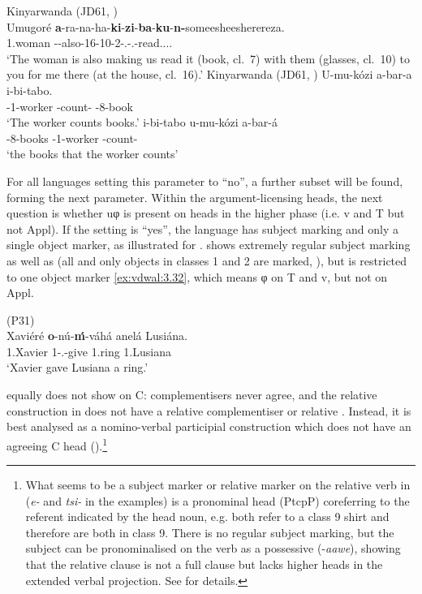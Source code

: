 \documentclass[output=paper]{langsci/langscibook}
\begin{document}
\ea\label{ex:vdwal:3.30}Kinyarwanda (JD61, \citealt[183]{BeauNurRos2004})\label{bkm:Ref317954425}\\
    \gll Umugoré  \textbf{a}{}-ra-na-ha-\textbf{ki}{}-\textbf{zi}{}-\textbf{ba}{}-\textbf{ku}{}-\textbf{n-}someesheesherereza.\\
    1.woman \First\Sm{}{}-\Dj{}-also-16\Om{}-10\Om{}-2\Om-\Ssg.\Om-\Fsg.\Om-read.\Caus{}.\Caus{}.\Appl{}.\Appl{}\\
    \glt    ‘The woman is also making us read it (book, cl.\ 7) with them (glasses,
        cl.\ 10) to you for me there (at the house, cl.\ 16).’
\ex \label{ex:vdwal:3.31}Kinyarwanda (JD61, \citealt[11]{ZellerNgoboka2014})\label{bkm:Ref345185298}
	\ea
	\gll	 U-mu-kózi  a-bar-a  i-bi-tabo.\\
	    \Aug{}{}-1-worker  \First\Sm{}{}-count-\Fv{}  \Aug{}{}-8-book\\
	\glt    ‘The worker counts books.’
	\ex
	\gll	 i-bi-tabo  u-mu-kózi  a-bar-á\\
	    \Aug{}{}-8-books  \Aug{}{}-1-worker  \First\Sm{}{}-count-\Fv{}\\
	\glt    ‘the books that the worker counts’
	\z
\z

For all languages setting this parameter to \enquote{no}, a further subset will be
found, forming the next parameter. Within the argument-licensing heads, the
next question is whether uφ is present on heads in the higher phase (i.e. v and
T but not Appl). If the setting is \enquote{yes}, the language has subject marking and
only a single object marker, as illustrated for .  shows
extremely regular subject marking as well as  (all and only
objects in classes 1 and 2 are marked, ), but is
restricted to one object marker \eqref{ex:vdwal:3.32}, which means φ on T and v, but
not on Appl.

\ea\label{ex:vdwal:3.32}  (P31) \label{bkm:Ref347928062}\\
    \gll    Xaviéré  \textbf{o}{}-nú-\textbf{ḿ}{}-váhá  anelá  Lusiána.\\
            1.Xavier  1\Sm-\Pfv.\Om{}-give  1.ring  1.Lusiana\\
    \glt        ‘Xavier gave Lusiana a ring.’
\z

 equally does not show  on C: complementisers never agree, and
the relative construction in  does not have a relative complementiser or
relative . Instead, it is best analysed as a nomino-verbal participial
construction which does not have an agreeing C head
().\footnote{What seems to be a subject marker or
relative marker on the relative verb in  (\emph{e-} and \emph{tsi-} in
the examples) is a pronominal head (PtcpP) coreferring to the referent
indicated by the head noun, e.g. both refer to a class 9 shirt and therefore
are both in class 9. There is no regular subject marking, but the subject can
be pronominalised on the verb as a possessive (-\emph{aawe}), showing that the
relative clause is not a full clause but lacks higher heads in the extended
verbal projection. See \Textcite{vanderWal2010} for details.}
\end{document}
